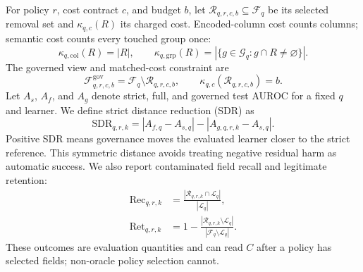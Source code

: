 \documentclass[sigconf,review]{acmart}
\begin{document}
For policy $r$, cost contract $c$, and budget $b$, let
$\mathcal{R}_{q,r,c,b}\subseteq\mathcal{F}_q$ be its selected removal set and
$\kappa_{q,c}(R)$ its charged cost. Encoded-column cost counts columns; semantic
cost counts every touched group once:
\begin{equation}
 \kappa_{q,\mathrm{col}}(R)=|R|,\qquad
 \kappa_{q,\mathrm{grp}}(R)=
 |\{g\in\mathcal{G}_q:g\cap R\neq\varnothing\}|.
 \label{eq:cost-map}
\end{equation}
The governed view and matched-cost constraint are
\begin{equation}
 \mathcal{F}^{\mathrm{gov}}_{q,r,c,b}
 =\mathcal{F}_q\setminus\mathcal{R}_{q,r,c,b},
 \qquad \kappa_{q,c}(\mathcal{R}_{q,r,c,b})=b.
 \label{eq:governed-view}
\end{equation}
Let $A_s$, $A_f$, and $A_g$ denote strict, full, and governed test AUROC for a
fixed $q$ and learner. We define strict distance reduction (SDR) as
\begin{equation}
 \mathrm{SDR}_{q,r,k}
 = |A_{f,q}-A_{s,q}|-|A_{g,q,r,k}-A_{s,q}|.
 \label{eq:sdr}
\end{equation}
Positive SDR means governance moves the evaluated learner closer to the strict
reference. This symmetric distance avoids treating negative residual harm as
automatic success. We also report contaminated field recall and legitimate
retention:
\begin{align}
 \mathrm{Rec}_{q,r,k}
 &=\frac{|\mathcal{R}_{q,r,k}\cap\mathcal{L}_q|}{|\mathcal{L}_q|},
 \label{eq:recall}\\
 \mathrm{Ret}_{q,r,k}
 &=1-\frac{|\mathcal{R}_{q,r,k}\setminus\mathcal{L}_q|}
 {|\mathcal{F}_q\setminus\mathcal{L}_q|}.
 \label{eq:retention}
\end{align}
These outcomes are evaluation quantities and can read $C$ after a policy has
selected fields; non-oracle policy selection cannot.
\end{document}

